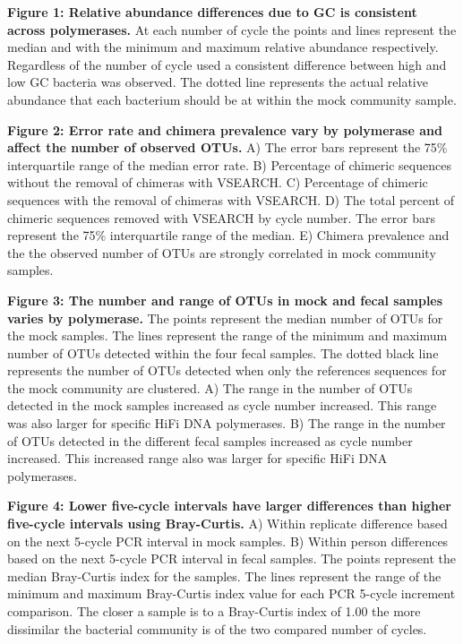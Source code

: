 \documentclass[11pt,]{article}
\begin{document}
\newpage

\textbf{Figure 1: Relative abundance differences due to GC is consistent
across polymerases.} At each number of cycle the points and lines
represent the median and with the minimum and maximum relative abundance
respectively. Regardless of the number of cycle used a consistent
difference between high and low GC bacteria was observed. The dotted
line represents the actual relative abundance that each bacterium should
be at within the mock community sample.

\textbf{Figure 2: Error rate and chimera prevalence vary by polymerase
and affect the number of observed OTUs.} A) The error bars represent the
75\% interquartile range of the median error rate. B) Percentage of
chimeric sequences without the removal of chimeras with VSEARCH. C)
Percentage of chimeric sequences with the removal of chimeras with
VSEARCH. D) The total percent of chimeric sequences removed with VSEARCH
by cycle number. The error bars represent the 75\% interquartile range
of the median. E) Chimera prevalence and the the observed number of OTUs
are strongly correlated in mock community samples.

\textbf{Figure 3: The number and range of OTUs in mock and fecal samples
varies by polymerase.} The points represent the median number of OTUs
for the mock samples. The lines represent the range of the minimum and
maximum number of OTUs detected within the four fecal samples. The
dotted black line represents the number of OTUs detected when only the
references sequences for the mock community are clustered. A) The range
in the number of OTUs detected in the mock samples increased as cycle
number increased. This range was also larger for specific HiFi DNA
polymerases. B) The range in the number of OTUs detected in the
different fecal samples increased as cycle number increased. This
increased range also was larger for specific HiFi DNA polymerases.

\textbf{Figure 4: Lower five-cycle intervals have larger differences
than higher five-cycle intervals using Bray-Curtis.} A) Within replicate
difference based on the next 5-cycle PCR interval in mock samples. B)
Within person differences based on the next 5-cycle PCR interval in
fecal samples. The points represent the median Bray-Curtis index for the
samples. The lines represent the range of the minimum and maximum
Bray-Curtis index value for each PCR 5-cycle increment comparison. The
closer a sample is to a Bray-Curtis index of 1.00 the more dissimilar
the bacterial community is of the two compared number of cycles.
\end{document}
